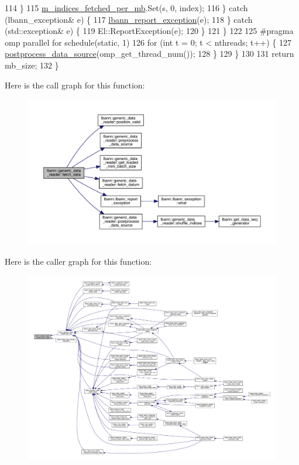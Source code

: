 \begin{DoxyCode}
114         \}
115         \hyperlink{classlbann_1_1generic__data__reader_a4ee1a159c74561c15a5e0c267ad3cc6a}{m\_indices\_fetched\_per\_mb}.Set(s, 0, index);
116       \} \textcolor{keywordflow}{catch} (lbann\_exception& e) \{
117         \hyperlink{namespacelbann_aedccb3bf2d674ccb5573ab9960720731}{lbann\_report\_exception}(e);
118       \} \textcolor{keywordflow}{catch} (std::exception& e) \{
119         El::ReportException(e);
120       \}
121     \}
122 
125 \textcolor{preprocessor}{    #pragma omp parallel for schedule(static, 1)}
126     \textcolor{keywordflow}{for} (\textcolor{keywordtype}{int} t = 0; t < nthreads; t++) \{
127       \hyperlink{classlbann_1_1generic__data__reader_a7bbf74725a96235dc1cd20ff440a69bd}{postprocess\_data\_source}(omp\_get\_thread\_num());
128     \}
129   \}
130 
131   \textcolor{keywordflow}{return} mb\_size;
132 \}
\end{DoxyCode}
Here is the call graph for this function\+:\nopagebreak
\begin{figure}[H]
\begin{center}
\leavevmode
\includegraphics[width=350pt]{classlbann_1_1generic__data__reader_a46b658ba4f6b746632b683568ab76f77_cgraph}
\end{center}
\end{figure}
Here is the caller graph for this function\+:\nopagebreak
\begin{figure}[H]
\begin{center}
\leavevmode
\includegraphics[width=350pt]{classlbann_1_1generic__data__reader_a46b658ba4f6b746632b683568ab76f77_icgraph}
\end{center}
\end{figure}
